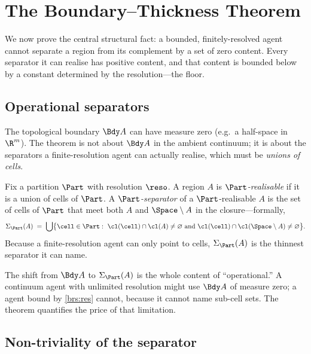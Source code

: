 
\section{The Boundary--Thickness Theorem}
\label{sec:thickness}

We now prove the central structural fact: a bounded, finitely-resolved agent
cannot separate a region from its complement by a set of zero content. Every
separator it can realise has positive content, and that content is bounded
below by a constant determined by the resolution---the floor.

\subsection{Operational separators}

The topological boundary $\Bdy A$ can have measure zero (e.g.\ a half-space in
$\R^m$). The theorem is not about $\Bdy A$ in the ambient continuum; it is about
the separators a finite-resolution agent can actually realise, which must be
\emph{unions of cells}.

\begin{definition}
\label{def:realisable}
Fix a partition $\Part$ with resolution $\reso$. A region $A$ is
\emph{$\Part$-realisable} if it is a union of cells of $\Part$. A
\emph{$\Part$-separator} of a $\Part$-realisable $A$ is the set of cells of
$\Part$ that meet both $A$ and $\Space\setminus A$ in the closure---formally,
\[
\Sigma_\Part(A)\;=\;\bigcup\bigl\{\cell\in\Part:\ \cl(\cell)\cap\cl(A)\neq\varnothing
\ \text{and}\ \cl(\cell)\cap\cl(\Space\setminus A)\neq\varnothing\bigr\}.
\]
Because a finite-resolution agent can only point to cells, $\Sigma_\Part(A)$ is
the thinnest separator it can name.
\end{definition}

\begin{remark}
The shift from $\Bdy A$ to $\Sigma_\Part(A)$ is the whole content of
``operational.'' A continuum agent with unlimited resolution might use $\Bdy A$
of measure zero; a agent bound by \ref{brs:res} cannot, because it cannot name
sub-cell sets. The theorem quantifies the price of that limitation.
\end{remark}

\subsection{Non-triviality of the separator}

